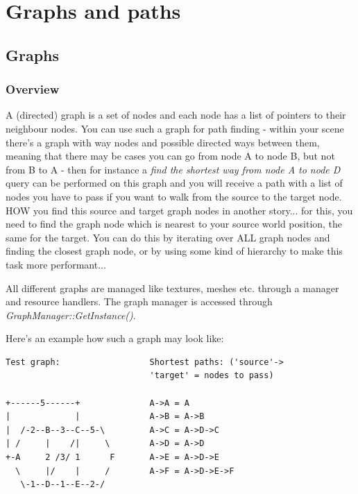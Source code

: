 \section{Graphs and paths}




\subsection{Graphs}



\subsubsection{Overview}
A (directed) graph is a set of nodes and each node has a list of pointers to their neighbour nodes. You can use such a graph for path finding - within your scene there's a graph with way nodes and possible directed ways between them, meaning that there may be cases you can go from node A to node B, but not from B to A - then for instance a \emph{find the shortest way from node A to node D} query can be performed on this graph and you will receive a path with a list of nodes you have to pass if you want to walk from the source to the target node. HOW you find this source and target graph nodes in another story... for this, you need to find the graph node which is nearest to your source world position, the same for the target. You can do this by iterating over ALL graph nodes and finding the closest graph node, or by using some kind of hierarchy to make this task more performant...

All different graphs are managed like textures, meshes etc. through a manager and resource handlers. The graph manager is accessed through \emph{GraphManager::GetInstance()}.

Here's an example how such a graph may look like:

\begin{lstlisting}[caption=Graph example]
Test graph:                  Shortest paths: ('source'->
                             'target' = nodes to pass)

+------5------+              A->A = A
|             |              A->B = A->B
|  /-2--B--3--C--5-\         A->C = A->D->C
| /     |    /|     \        A->D = A->D
+-A     2 /3/ 1      F       A->E = A->D->E
  \     |/    |     /        A->F = A->D->E->F
   \-1--D--1--E--2-/

\end{lstlisting}

